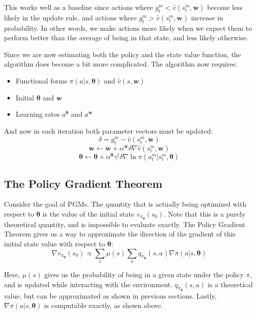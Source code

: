 \documentclass{article}
\begin{document}
This works well as a baseline since actions where $g_t^m < \hat{v}(s_t^m, \bm{w})$ become less likely in the update rule,
and actions where $g_t^m > \hat{v}(s_t^m, \bm{w})$ increase in probability. In other words, we make actions more likely when we expect
them to perform better than the average of being in that state, and less likely otherwise.

Since we are now estimating both the policy and the state value function, the algorithm does become a bit more complicated. The algorithm now requires:
\begin{itemize}
  \item Functional forms $\pi(a|s, \bm{\theta})$ and $\hat{v}(s, \bm{w})$
  \item Initial $\bm{\theta}$ and $\bm{w}$
  \item Learning rates $a^{\bm{\theta}}$ and $a^{\bm{w}}$
\end{itemize}

And now in each iteration both parameter vectors must be updated:
\begin{equation}
  \delta = g_t^m - \hat{v}(s_t^m, \bm{w})
\end{equation}
\begin{equation}
  \bm{w} \leftarrow \bm{w} + \alpha^{\bm{w}} \delta \nabla \hat{v}(s_t^m, \bm{w})
\end{equation}
\begin{equation}
  \bm{\theta} \leftarrow \bm{\theta} + \alpha^{\bm{\theta}} \gamma^t \delta \nabla \ln \pi(a_t^m|s_t^m, \bm{\theta})
\end{equation}

\subsection{The Policy Gradient Theorem}
Consider the goal of PGMs. The quantity that is actually being optimized with respect to $\bm{\theta}$ is the value of the initial state $v_{\pi_{\bm{\theta}}}(s_0)$.
Note that this is a purely theoretical quantity, and is impossible to evaluate exactly. The Policy Gradient Theorem gives us a way to approximate 
the direction of the gradient of this initial state value with respect to $\bm{\theta}$:
\begin{equation}
  \nabla v_{\pi_{\bm{\theta}}}(s_0) \propto \sum_{s} \mu(s) \sum_a q_{\pi_{\bm{\theta}}}(s,a) \nabla \pi(a|s, \bm{\theta})
\end{equation}

Here, $\mu(s)$ gives us the probability of being in a given state under the policy $\pi$, and is updated while interacting with the environment. 
$q_{\pi_{\bm{\theta}}}(s,a)$ is a theoretical value, but can be approximated as shown in previous sections. Lastly, $\nabla \pi(a|s, \bm{\theta})$
is computable exactly, as shown above.
\end{document}
